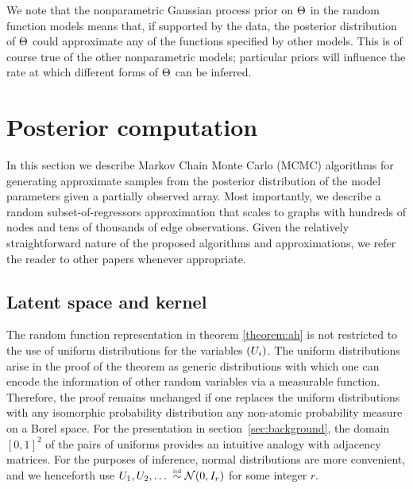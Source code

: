 
We note that the nonparametric Gaussian process prior on $\Theta$ in the random function models means that, if supported by the data, the posterior distribution of $\Theta$ could approximate any of the functions specified by other models.
This is of course true of the other nonparametric models; particular priors will influence the rate at which different forms of $\Theta$ can be inferred.

\section{Posterior computation}
\label{sec:Inference}

In this section we describe Markov Chain Monte Carlo (MCMC) algorithms for generating approximate samples from the posterior distribution of the model parameters given a partially observed array.  Most importantly, we describe a random subset-of-regressors approximation that scales to graphs with hundreds of nodes and tens of thousands of edge observations. Given the relatively straightforward nature of the proposed algorithms and approximations, we refer the reader to other papers whenever appropriate.

\subsection{Latent space and kernel}
\label{sec:Kernel}
The random function representation in theorem \ref{theorem:ah} is not restricted to the use of uniform distributions for the variables $(U_i)$.
The uniform distributions arise in the proof of the theorem as generic distributions with which one can encode the information of other random variables via a measurable function.
Therefore, the proof remains unchanged if one replaces the uniform distributions with any isomorphic probability distribution \ie any non-atomic
probability measure on a Borel space.
For the presentation in section~\ref{sec:background}, the domain $[0,1]^2$ of the pairs of uniforms provides an intuitive analogy
with adjacency matrices.
For the purposes of inference, normal distributions are more convenient, and we henceforth use ${U_{1},U_{2},\ldots\; \overset{\mbox{\tiny iid}}{\sim} \mathcal{N}(0, I_r)}$ for some integer $r$.

